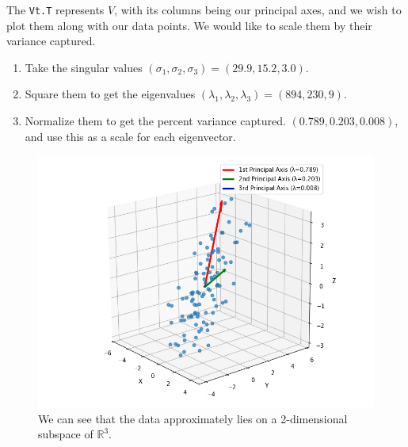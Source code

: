 \begin{example}[Walkthrough]
    The \texttt{Vt.T} represents $V$, with its columns being our principal axes, and we wish to plot them along with our data points. We would like to scale them by their variance captured. 
    \begin{enumerate}
      \item Take the singular values $(\sigma_1, \sigma_2, \sigma_3) = (29.9, 15.2, 3.0)$. 
      \item Square them to get the eigenvalues $(\lambda_1, \lambda_2, \lambda_3) = (894, 230, 9)$. 
      \item Normalize them to get the percent variance captured. $(0.789, 0.203, 0.008)$, and use this as a scale for each eigenvector. 
    \end{enumerate}

    \begin{figure}[H]
      \centering 
      \includegraphics[scale=0.4]{img/pca_3d.png}
      \caption{We can see that the data approximately lies on a 2-dimensional subspace of $\mathbb{R}^3$.} 
    \end{figure}
  \end{example}

